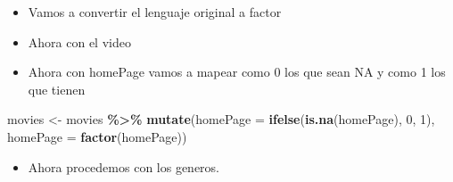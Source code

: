 \documentclass[
]{article}
\newenvironment{Shaded}{\begin{snugshade}}{\end{snugshade}}
\newcommand{\AttributeTok}[1]{\textcolor[rgb]{0.13,0.29,0.53}{#1}}
\newcommand{\ConstantTok}[1]{\textcolor[rgb]{0.56,0.35,0.01}{#1}}
\newcommand{\DecValTok}[1]{\textcolor[rgb]{0.00,0.00,0.81}{#1}}
\newcommand{\FunctionTok}[1]{\textcolor[rgb]{0.13,0.29,0.53}{\textbf{#1}}}
\newcommand{\NormalTok}[1]{#1}
\newcommand{\OtherTok}[1]{\textcolor[rgb]{0.56,0.35,0.01}{#1}}
\newcommand{\SpecialCharTok}[1]{\textcolor[rgb]{0.81,0.36,0.00}{\textbf{#1}}}
\providecommand{\tightlist}{%
  \setlength{\itemsep}{0pt}\setlength{\parskip}{0pt}}
\begin{document}
\begin{itemize}
\tightlist
\item
  Vamos a convertir el lenguaje original a factor
\end{itemize}

\begin{Shaded}
\end{Shaded}

\begin{itemize}
\tightlist
\item
  Ahora con el video
\end{itemize}

\begin{Shaded}
\end{Shaded}

\begin{itemize}
\tightlist
\item
  Ahora con homePage vamos a mapear como 0 los que sean NA y como 1 los
  que tienen
\end{itemize}

\begin{Shaded}
\begin{Highlighting}[]
\NormalTok{movies }\OtherTok{\textless{}{-}}\NormalTok{ movies }\SpecialCharTok{\%\textgreater{}\%}
  \FunctionTok{mutate}\NormalTok{(}\AttributeTok{homePage =} \FunctionTok{ifelse}\NormalTok{(}\FunctionTok{is.na}\NormalTok{(homePage), }\DecValTok{0}\NormalTok{, }\DecValTok{1}\NormalTok{),}
         \AttributeTok{homePage =} \FunctionTok{factor}\NormalTok{(homePage))}
\end{Highlighting}
\end{Shaded}

\begin{itemize}
\tightlist
\item
  Ahora procedemos con los generos.
\end{itemize}
\end{document}
